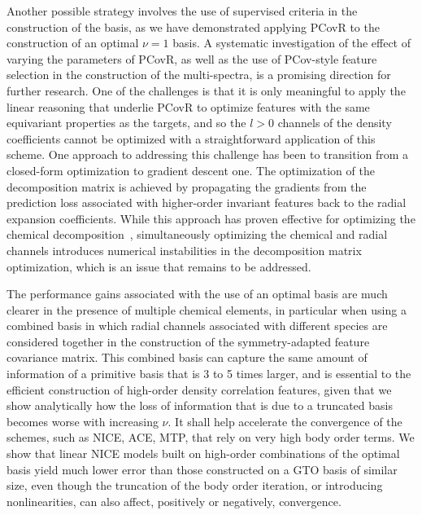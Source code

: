 Another possible strategy involves the use of supervised criteria in the construction of the basis, as we have demonstrated applying PCovR to the construction of an optimal $\nu=1$ basis.
A systematic investigation of the effect of varying the parameters of PCovR, as well as the use of PCov-style feature selection\cite{cers+21mlst} in the construction of the multi-spectra, is a promising direction for further research.
One of the challenges is that it is only meaningful to apply the linear reasoning that underlie PCovR to optimize features with the same equivariant properties as the targets, and so the $l>0$ channels of the density coefficients cannot be optimized with a straightforward application of this scheme.
One approach to addressing this challenge has been to transition from a closed-form optimization to gradient descent one.
The optimization of the decomposition matrix is achieved by propagating the gradients from the prediction loss associated with higher-order invariant features back to the radial expansion coefficients.
While this approach has proven effective for optimizing the chemical decomposition~\cite{lopanitsyna2023modeling}, simultaneously optimizing the chemical and radial channels introduces numerical instabilities in the decomposition matrix optimization, which is an issue that remains to be addressed.

The performance gains associated with the use of an optimal basis are much clearer in the presence of multiple chemical elements, in particular when using a combined basis in which radial channels associated with different species are considered together in the construction of the symmetry-adapted feature covariance matrix. 
This combined basis can capture the same amount of information of a primitive basis that is 3 to 5 times larger, and is essential to the efficient construction of high-order density correlation features, given that we show analytically how the loss of information that is due to a truncated basis becomes worse with increasing $\nu$. It shall help accelerate the convergence of the schemes, such as NICE, ACE, MTP, that rely on very high body order terms. 
We show that linear NICE models built on high-order combinations of the optimal basis yield much lower error than those constructed on a GTO basis of similar size, even though the truncation of the body order iteration, or introducing nonlinearities, can also affect, positively or negatively, convergence. 

